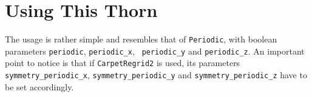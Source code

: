 \section{Using This Thorn}
The usage is rather simple and resembles that of {\tt Periodic}, 
with boolean parameters {\tt periodic}, {\tt periodic\_x}, {\tt 
periodic\_y} and {\tt periodic\_z}. An important point to notice is 
that if {\tt CarpetRegrid2} is used, its parameters {\tt symmetry\_periodic\_x}, 
{\tt  symmetry\_periodic\_y} and {\tt symmetry\_periodic\_z} have to be
set accordingly.










